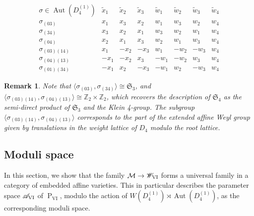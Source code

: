 \documentclass[a4paper,reqno]{amsart}
\numberwithin{equation}{section}
\newcommand{\Z}{\mathbb{Z}}
\newcommand{\pain}[1]{\operatorname{P}_{\mathrm{#1}}}
\DeclareMathOperator{\Aut}{Aut}
\newtheorem{remark}[theorem]{Remark}
\numberwithin{equation}{section}
\begin{document}
\begin{table}[h]
    \begin{equation*}
    \begin{array}{c||c|c|c||c|c|c|c|}
        \sigma \in \Aut(D_4^{(1)})      & \tilde{x}_1    & \tilde{x}_2     & \tilde{x}_3   & \tilde{w}_1   & \tilde{w}_2   & \tilde{w}_3   &  \tilde{w}_4          \\
        \hline\hline 
        \sigma_{(03)}   & x_1     & x_3     & x_2   & w_1   & w_3   & w_2   &  w_4          \\
        \sigma_{(34)}   & x_3    & x_2     & x_1   & w_3   & w_2   & w_1   &  w_4          \\
        \sigma_{(04)}   & x_2    & x_1     & x_3   & w_2   & w_1   & w_3   &  w_4          \\
        \sigma_{(03)(14)}   & x_1     & -x_2     & -x_3   & w_1   & -w_2   & -w_3   &  w_4   \\
        \sigma_{(04)(13)}   & -x_1     & -x_2     & x_3   & -w_1   & -w_2   & w_3   &  w_4   \\
        \sigma_{(01)(34)}   & -x_1     & x_2     & -x_3   & -w_1   & w_2   & - w_3   &  w_4  
    \end{array}
    \end{equation*}
    \caption{Action of $\Aut(D_4^{(1)})$ symmetries of $\pain{VI}$ on $\mathcal{M}\rightarrow\mathscr{W}_{\rm VI}$}
    \label{tab:PVI:symmetry:ws}
\end{table}
\endgroup


\begin{remark}
    Note that $\langle\sigma_{(03)},\sigma_{(34)}\rangle \cong \mathfrak{S}_3$, and $\langle\sigma_{(03)(14)}, \sigma_{(04)(13)}\rangle\cong \Z_2\times\Z_2$, which recovers the description of $\mathfrak{S}_4$ as the semi-direct product of $\mathfrak{S}_3$ and the Klein 4-group.
    The subgroup $\langle\sigma_{(03)(14)}, \sigma_{(04)(13)}\rangle$ corresponds to the part of the extended affine Weyl group given by  translations in the weight lattice of $D_4$ modulo the root lattice.
\end{remark}








\subsection{Moduli space}
In this section, we show that the family $\mathcal{M}\rightarrow \mathscr{W}_{\rm VI}$ forms a universal family in a category of embedded affine varieties. This in particular describes the parameter space $\mathscr{A}_{\rm VI}$ of $\pain{VI}$, modulo the action of $W(D_4^{(1)})\rtimes \Aut(D_4^{(1)})$, as the corresponding moduli space.
\end{document}
